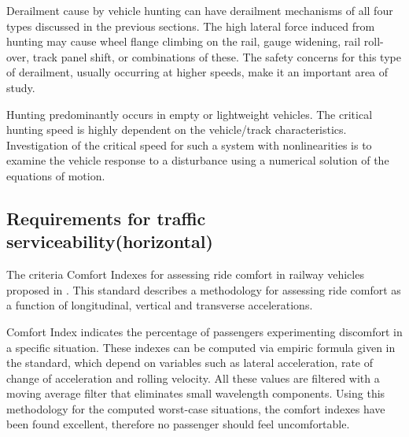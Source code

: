 Derailment cause by vehicle hunting can have derailment mechanisms of all four types discussed in the previous sections. The high lateral force induced from hunting may cause wheel flange climbing on the rail, gauge widening, rail roll-over, track panel shift, or combinations of these. The safety concerns for this type of derailment, usually occurring at higher speeds, make it an important area of study.

Hunting predominantly occurs in empty or lightweight vehicles. The critical hunting speed is highly dependent on the vehicle/track characteristics. Investigation of the critical speed for such a system with nonlinearities is to examine the vehicle response to a disturbance using a numerical solution of the equations of motion.

\subsection{Requirements for traffic serviceability(horizontal)}

The criteria Comfort Indexes for assessing ride comfort in railway vehicles proposed in \cite{12299}. This standard describes a methodology for assessing ride comfort as a function of longitudinal, vertical and transverse accelerations.

Comfort Index indicates the percentage of passengers experimenting discomfort in a specific situation. These indexes can be computed via empiric formula given in the standard, which depend on variables such as lateral acceleration, rate of change of acceleration and rolling velocity. All these values are filtered with a moving average filter that eliminates small wavelength components. Using this methodology for the computed worst-case situations, the comfort indexes have been found excellent, therefore no passenger should feel uncomfortable.
